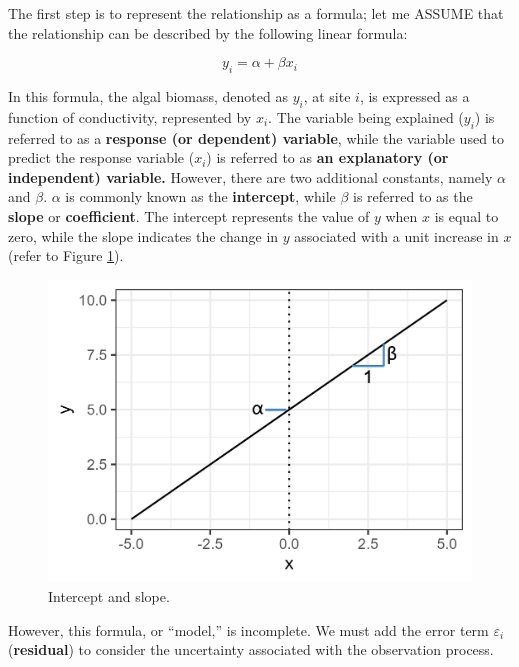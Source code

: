 \documentclass[
]{article}
\begin{document}
The first step is to represent the relationship as a formula; let me ASSUME that the relationship can be described by the following linear formula:

\[
y_i = \alpha + \beta x_i
\]

In this formula, the algal biomass, denoted as \(y_i\), at site \(i\), is expressed as a function of conductivity, represented by \(x_i\). The variable being explained (\(y_i\)) is referred to as a \textbf{response (or dependent) variable}, while the variable used to predict the response variable (\(x_i\)) is referred to as \textbf{an explanatory (or independent) variable.} However, there are two additional constants, namely \(\alpha\) and \(\beta\). \(\alpha\) is commonly known as the \textbf{intercept}, while \(\beta\) is referred to as the \textbf{slope} or \textbf{coefficient}. The intercept represents the value of \(y\) when \(x\) is equal to zero, while the slope indicates the change in \(y\) associated with a unit increase in \(x\) (refer to Figure \ref{fig:intercept-slope}).

\begin{figure}

{\centering \includegraphics[width=14.58in]{image/figure_lm} 

}

\caption{Intercept and slope.}\label{fig:intercept-slope}
\end{figure}

However, this formula, or ``model,'' is incomplete. We must add the error term \(\varepsilon_i\) (\textbf{residual}) to consider the uncertainty associated with the observation process.
\end{document}
